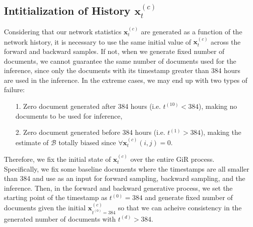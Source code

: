 \documentclass[a4paper]{article}
\begin{document}
        \subsection{Intitialization of History $\boldsymbol{x}_t^{(c)}$} \label{subsec: Initial history issue}
        Considering that our network statistics $\boldsymbol{x}_t^{(c)}$ are generated as a function of the network history, it is necessary to use the same initial value of $\boldsymbol{x}_t^{(c)}$ across the forward and backward samples. If not, when we generate fixed number of documents, we cannot guarantee the same number of documents used for the inference, since only the documents with its timestamp greater than 384 hours are used in the inference. In the extreme cases, we may end up with two types of failure:
        \begin{itemize}
        	\item[1.] Zero document generated after 384 hours (i.e. $t^{(10)} < 384$), making no documents to be used for inference,
        	\item[2.] Zero document generated before 384 hours (i.e. $t^{(1)} > 384$), making the estimate of $\mathcal{B}$ totally biased since $\forall  \boldsymbol{x}_t^{(c)}(i, j) = 0$. 
        \end{itemize}
        Therefore, we fix the initial state of $\boldsymbol{x}_t^{(c)}$ over the entire GiR process. Specifically, we fix some baseline documents where the timestamps are all smaller than 384 and use as an input for forward sampling, backward sampling, and the inference. Then, in the forward and backward generative process, we set the starting point of the timestamp as $t^{(0)} = 384$ and generate fixed number of documents given the initial $\boldsymbol{x}_{t^{(0)} = 384}^{(c)}$ so that we can acheive consistency in the generated number of documents with $t^{(d)} > 384$.
      
                
\end{document}
